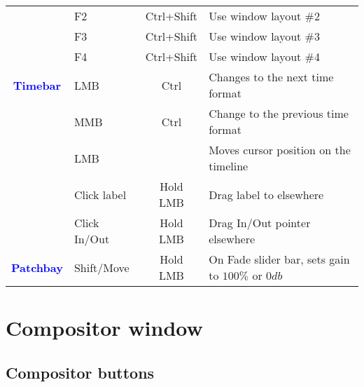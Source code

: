 \begin{center}
\begin{longtable}{ >{\bfseries}c l c p{6cm}}
        & F2 & Ctrl+Shift & Use window layout \#2 \\        
        & F3 & Ctrl+Shift & Use window layout \#3 \\        
        & F4 & Ctrl+Shift & Use window layout \#4 \\
        \midrule
        \textcolor{blue}{Timebar} & LMB & Ctrl & Changes to the next time format \\        
        & MMB & Ctrl & Change to the previous time format \\        
        & LMB &  & Moves cursor position on the timeline \\        
        & Click label & Hold LMB & Drag label to elsewhere \\        
        & Click In/Out & Hold LMB & Drag In/Out pointer elsewhere \\
        \midrule
        \textcolor{blue}{Patchbay} & Shift/Move & Hold LMB & On Fade slider bar, sets gain to $100\%$ or $0db$ \\
        
        \bottomrule  
    \end{longtable}
\end{center}

\section{Compositor window }%
\label{sec:compositor_window}

\subsection{Compositor buttons }%
\label{ssec:compositor_buttons}


